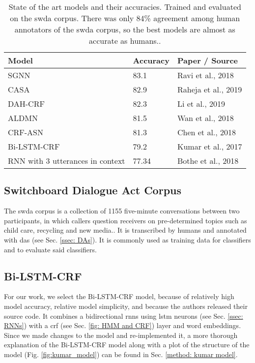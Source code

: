     \begin{table}[h]
    \centering
    \begin{tabular}{|l|l|l|}
    \hline
    \textbf{Model}                   & \textbf{Accuracy} & \textbf{Paper / Source}      \\ \hline
    SGNN                             & 83.1              & Ravi et al., 2018 \cite{ravi2018self}   \\ \hline
    CASA                             & 82.9              & Raheja et al., 2019\cite{raheja2019dialogue} \\ \hline
    DAH-CRF                          & 82.3              & Li et al., 2019 \cite{li2018dual}     \\ \hline
    ALDMN                            & 81.5              & Wan et al., 2018 \cite{wan2018improved}    \\ \hline
    CRF-ASN                          & 81.3              & Chen et al., 2018 \cite{chen2018dialogue}   \\ \hline
    Bi-LSTM-CRF                      & 79.2              & Kumar et al., 2017 \cite{kumar2017dialogue}  \\ \hline
    RNN with 3 utterances in context & 77.34             & Bothe et al., 2018 \cite{bothe2018context}  \\ \hline
    \end{tabular}
    \caption{State of the art models and their accuracies. Trained and evaluated on the \gls{swda} corpus. There was only 84\% agreement among human annotators of the \gls{swda} corpus, so the best models are almost as accurate as humans.\cite{swda}.}
    \label{table: da models}
    \end{table}
    
    \subsection{Switchboard Dialogue Act Corpus \label{ssec: swda}}
        The \gls{swda} corpus is a collection of 1155 five-minute conversations between two participants, in which callers question receivers on pre-determined topics such as child care, recycling and new media.\cite{fang2012annotation}. It is transcribed by humans and annotated with \glspl{da} (see Sec. \ref{ssec: DAs}). It is commonly used as training data for classifiers and to evaluate said classifiers.
    
    \subsection{Bi-LSTM-CRF \label{sssec: kumar model}}
    For our work, we select the Bi-LSTM-CRF model\cite{kumar2017dialogue}, because of relatively high model accuracy, relative model simplicity, and because the authors released their source code. It combines a bidirectional \glspl{rnn} using \gls{lstm} \glspl{neuron} (see Sec. \ref{ssec: RNNs}) with a \gls{crf} (see Sec. \ref{fig: HMM and CRF}) layer and word \glspl{embedding}. Since we made changes to the model and re-implemented it, a more thorough explanation of the Bi-LSTM-CRF model along with a plot of the structure of the model (Fig. \ref{fig:kumar_model}) can be found in Sec. \ref{method: kumar model}.